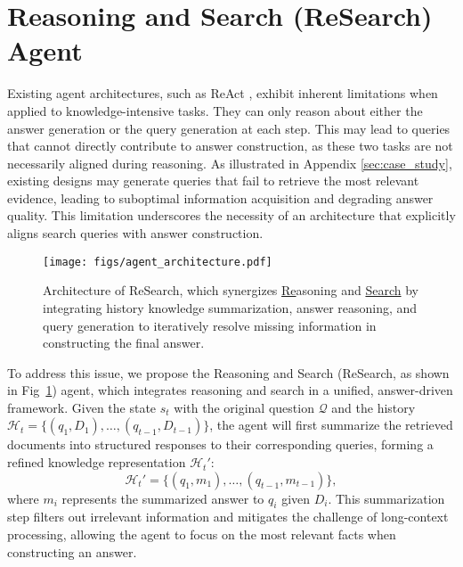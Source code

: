 \section{Reasoning and Search (ReSearch) Agent}

Existing agent architectures, such as ReAct \citep{yao2023react}, exhibit inherent limitations when applied to knowledge-intensive tasks. They can only reason about either the answer generation or the query generation at each step. This may lead to queries that cannot directly contribute to answer construction, as these two tasks are not necessarily aligned during reasoning. As illustrated in Appendix \ref{sec:case_study}, existing designs may generate queries that fail to retrieve the most relevant evidence, leading to suboptimal information acquisition and degrading answer quality. This limitation underscores the necessity of an architecture that explicitly aligns search queries with answer construction.


\begin{figure}[ht!]
    \centering
    \texttt{[image: figs/agent\_architecture.pdf]}
    \caption{Architecture of ReSearch, which synergizes \underline{Re}asoning and \underline{Search} by integrating history knowledge summarization, answer reasoning, and query generation to iteratively resolve missing information in constructing the final answer.}
    \label{fig:architecture}
\end{figure}



To address this issue, we propose the Reasoning and Search (ReSearch, as shown in Fig~\ref{fig:architecture}) agent, which integrates reasoning and search in a unified, answer-driven framework. 
Given the state \(s_t\) with the original question \(\mathcal{Q}\) and the history \(\mathcal{H}_t = \{(q_1, D_1), \dots, (q_{t-1}, D_{t-1})\}\),
the agent will first summarize the retrieved documents into structured responses to their corresponding queries, forming a refined knowledge representation $\mathcal{H}_t'$:
\begin{equation}
    \mathcal{H}_t' = \{(q_1, m_1), \dots, (q_{t-1}, m_{t-1})\},
\end{equation}
where $ m_i $ represents the summarized answer to $q_i$ given $ D_i $. This summarization step filters out irrelevant information and mitigates the challenge of long-context processing, allowing the agent to focus on the most relevant facts when constructing an answer.

